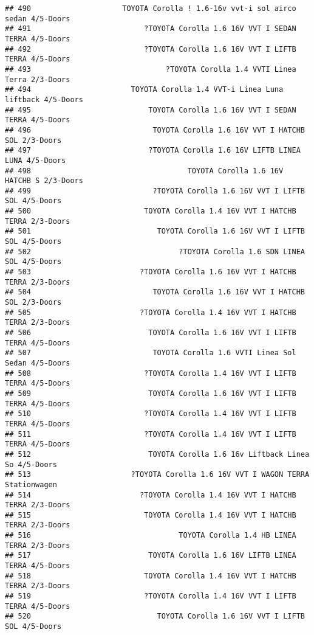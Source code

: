 \documentclass[]{article}
\begin{document}
\begin{verbatim}
## 490                     TOYOTA Corolla ! 1.6-16v vvt-i sol airco sedan 4/5-Doors
## 491                          ?TOYOTA Corolla 1.6 16V VVT I SEDAN TERRA 4/5-Doors
## 492                          ?TOYOTA Corolla 1.6 16V VVT I LIFTB TERRA 4/5-Doors
## 493                               ?TOYOTA Corolla 1.4 VVTI Linea Terra 2/3-Doors
## 494                       TOYOTA Corolla 1.4 VVT-i Linea Luna liftback 4/5-Doors
## 495                           TOYOTA Corolla 1.6 16V VVT I SEDAN TERRA 4/5-Doors
## 496                            TOYOTA Corolla 1.6 16V VVT I HATCHB SOL 2/3-Doors
## 497                           ?TOYOTA Corolla 1.6 16V LIFTB LINEA LUNA 4/5-Doors
## 498                                    TOYOTA Corolla 1.6 16V HATCHB S 2/3-Doors
## 499                            ?TOYOTA Corolla 1.6 16V VVT I LIFTB SOL 4/5-Doors
## 500                          TOYOTA Corolla 1.4 16V VVT I HATCHB TERRA 2/3-Doors
## 501                             TOYOTA Corolla 1.6 16V VVT I LIFTB SOL 4/5-Doors
## 502                                  ?TOYOTA Corolla 1.6 SDN LINEA SOL 4/5-Doors
## 503                         ?TOYOTA Corolla 1.6 16V VVT I HATCHB TERRA 2/3-Doors
## 504                            TOYOTA Corolla 1.6 16V VVT I HATCHB SOL 2/3-Doors
## 505                         ?TOYOTA Corolla 1.4 16V VVT I HATCHB TERRA 2/3-Doors
## 506                           TOYOTA Corolla 1.6 16V VVT I LIFTB TERRA 4/5-Doors
## 507                            TOYOTA Corolla 1.6 VVTI Linea Sol Sedan 4/5-Doors
## 508                          ?TOYOTA Corolla 1.4 16V VVT I LIFTB TERRA 4/5-Doors
## 509                           TOYOTA Corolla 1.6 16V VVT I LIFTB TERRA 4/5-Doors
## 510                          ?TOYOTA Corolla 1.4 16V VVT I LIFTB TERRA 4/5-Doors
## 511                          ?TOYOTA Corolla 1.4 16V VVT I LIFTB TERRA 4/5-Doors
## 512                           TOYOTA Corolla 1.6 16v Liftback Linea So 4/5-Doors
## 513                       ?TOYOTA Corolla 1.6 16V VVT I WAGON TERRA Stationwagen
## 514                         ?TOYOTA Corolla 1.4 16V VVT I HATCHB TERRA 2/3-Doors
## 515                          TOYOTA Corolla 1.4 16V VVT I HATCHB TERRA 2/3-Doors
## 516                                  TOYOTA Corolla 1.4 HB LINEA TERRA 2/3-Doors
## 517                           TOYOTA Corolla 1.6 16V LIFTB LINEA TERRA 4/5-Doors
## 518                          TOYOTA Corolla 1.4 16V VVT I HATCHB TERRA 2/3-Doors
## 519                          ?TOYOTA Corolla 1.4 16V VVT I LIFTB TERRA 4/5-Doors
## 520                             TOYOTA Corolla 1.6 16V VVT I LIFTB SOL 4/5-Doors

\end{verbatim}
\end{document}
